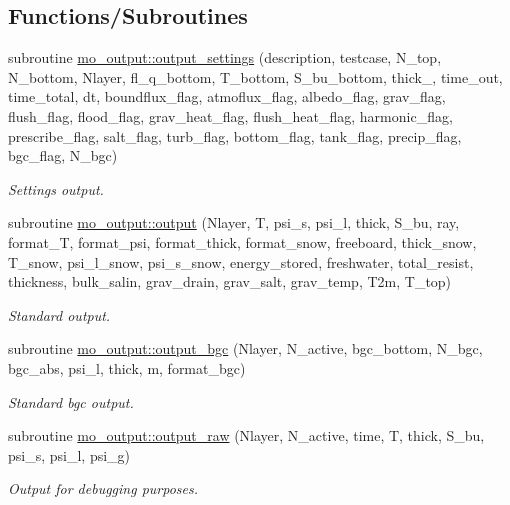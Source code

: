 \subsection*{Functions/Subroutines}
\begin{DoxyCompactItemize}
\item 
subroutine \hyperlink{namespacemo__output_a9d48b3b49e6dbe858e06c8fe1dc4bfbd}{mo\_\-output::output\_\-settings} (description, testcase, N\_\-top, N\_\-bottom, Nlayer, fl\_\-q\_\-bottom, T\_\-bottom, S\_\-bu\_\-bottom, thick\_, time\_\-out, time\_\-total, dt, boundflux\_\-flag, atmoflux\_\-flag, albedo\_\-flag, grav\_\-flag, flush\_\-flag, flood\_\-flag, grav\_\-heat\_\-flag, flush\_\-heat\_\-flag, harmonic\_\-flag, prescribe\_\-flag, salt\_\-flag, turb\_\-flag, bottom\_\-flag, tank\_\-flag, precip\_\-flag, bgc\_\-flag, N\_\-bgc)
\begin{DoxyCompactList}\small\item\em Settings output. \item\end{DoxyCompactList}\item 
subroutine \hyperlink{namespacemo__output_a2f2d04e394ea77f4d4c0a61207edd0a6}{mo\_\-output::output} (Nlayer, T, psi\_\-s, psi\_\-l, thick, S\_\-bu, ray, format\_\-T, format\_\-psi, format\_\-thick, format\_\-snow, freeboard, thick\_\-snow, T\_\-snow, psi\_\-l\_\-snow, psi\_\-s\_\-snow, energy\_\-stored, freshwater, total\_\-resist, thickness, bulk\_\-salin, grav\_\-drain, grav\_\-salt, grav\_\-temp, T2m, T\_\-top)
\begin{DoxyCompactList}\small\item\em Standard output. \item\end{DoxyCompactList}\item 
subroutine \hyperlink{namespacemo__output_a0c4b84f221bda333c52a4aaa7e2a854d}{mo\_\-output::output\_\-bgc} (Nlayer, N\_\-active, bgc\_\-bottom, N\_\-bgc, bgc\_\-abs, psi\_\-l, thick, m, format\_\-bgc)
\begin{DoxyCompactList}\small\item\em Standard bgc output. \item\end{DoxyCompactList}\item 
subroutine \hyperlink{namespacemo__output_ab7532889e9a83e66ff86ec9fee17cb04}{mo\_\-output::output\_\-raw} (Nlayer, N\_\-active, time, T, thick, S\_\-bu, psi\_\-s, psi\_\-l, psi\_\-g)
\begin{DoxyCompactList}\small\item\em Output for debugging purposes. \item\end{DoxyCompactList}\item 

\end{DoxyCompactItemize}
